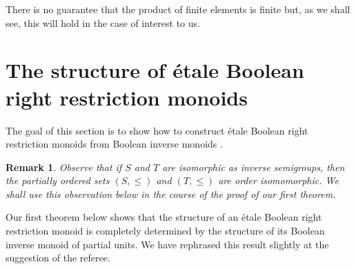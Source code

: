 \documentclass[a4paper]{amsart}
\newtheorem{remark}[theorem]{Remark}
\begin{document}
There is no guarantee that the product of finite elements is finite
but, as we shall see, this will hold in the case of interest to us.







\section{The structure of \'etale Boolean right restriction monoids}

The goal of this section is to show how to construct \'etale Boolean right restriction monoids from Boolean inverse monoids \cite{Wehrung}.


\begin{remark}{\em Observe that if $S$ and $T$ are isomorphic as inverse semigroups,
then the partially ordered sets $(S,\leq)$ and $(T,\leq)$ are order isomomorphic.
We shall use this observation below in the course of the proof of our first theorem.}
\end{remark}

Our first theorem below shows that the structure of an  \'etale Boolean right restriction monoid is completely
determined by the structure of its Boolean inverse monoid of partial units.
We have rephrased this result slightly at the suggestion of the referee.
\end{document}
